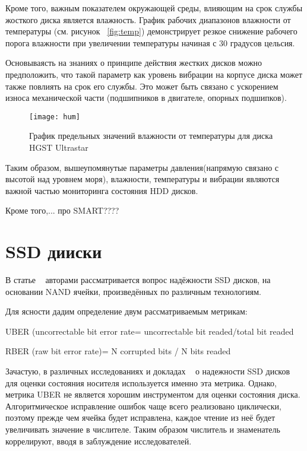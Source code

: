 Кроме того, важным показателем окружающей среды, влияющим на срок службы жосткого диска является влажность. График рабочих диапазонов влажности от температуры (см. рисунок ~\ref{fig:temp}) демонстрирует резкое снижение рабочего порога влажности при увеличении температуры начиная с 30 градусов цельсия. 

Основываясть на знаниях о принципе действия жестких дисков можно предположить, что такой параметр как уровень вибрации на корпусе диска может также повлиять на срок его службы. Это может быть связано с ускорением износа механической части (подшипников в двигателе, опорных подшипков).

\begin{figure}[!h]
	\centering
	\texttt{[image: hum]}
	\caption{График предельных значений влажности от температуры для диска HGST Ultrastar}
	\label{fig:hum}
\end{figure}

Таким образом, вышеупомянутые параметры давления(напрямую связано с высотой над уровнем моря), влажности, температуры и вибрации являются важной частью мониторинга состояния HDD дисков. 

Кроме того,... про SMART????
\section{SSD дииски}

В статье ~\cite{reliabil} авторами рассматривается вопрос надёжности SSD дисков, на основании NAND ячейки, произведённых по различным технологиям.

Для ясности дадим определение двум рассматриваемым метрикам:
\begin{itemize*}
	\item{UBER (uncorrectable bit error rate= uncorrectable bit readed/total bit readed}
	\item{RBER (raw bit error rate)= N corrupted bits / N bits readed}
\end{itemize*}
Зачастую, в различных исследованиях и докладах ~\cite{art} о надежности SSD дисков для оценки состояния носителя используется именно эта метрика. 
Однако, метрика UBER не является хорошим инструментом для оценки состояния диска. Алгоритмическое исправление ошибок чаще всего реализовано циклически, поэтому прежде чем ячейка будет исправлена, каждое чтение из неё будет увеличивать значение в числителе. Таким образом числитель и знаменатель коррелируют, вводя в заблуждение исследователей. 

